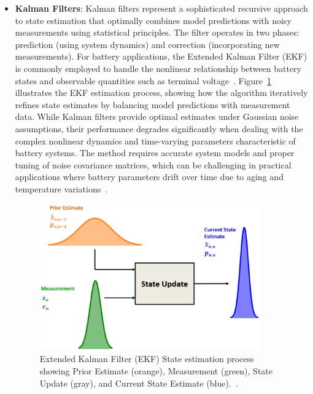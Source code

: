 \begin{itemize}
    \item \textbf{Kalman Filters}: Kalman filters represent a sophisticated recursive approach to state estimation that optimally combines model predictions with noisy measurements using statistical principles. The filter operates in two phases: prediction (using system dynamics) and correction (incorporating new measurements). For battery applications, the Extended Kalman Filter (EKF) is commonly employed to handle the nonlinear relationship between battery states and observable quantities such as terminal voltage~\cite{mastali_battery_2013}. Figure~\ref{fig:ekf_diagram} illustrates the EKF estimation process, showing how the algorithm iteratively refines state estimates by balancing model predictions with measurement data. While Kalman filters provide optimal estimates under Gaussian noise assumptions, their performance degrades significantly when dealing with the complex nonlinear dynamics and time-varying parameters characteristic of battery systems. The method requires accurate system models and proper tuning of noise covariance matrices, which can be challenging in practical applications where battery parameters drift over time due to aging and temperature variations~\cite{becker_wwwkalmanfilternet_online_nodate}.

\begin{figure}[htbp]
\centering
\includegraphics[width=0.9\textwidth]{imgs/ekf.png}
\caption{Extended Kalman Filter (EKF) State estimation process showing Prior Estimate (orange), Measurement (green), State Update (gray), and Current State Estimate (blue).~\cite{becker_wwwkalmanfilternet_online_nodate}.}
\label{fig:ekf_diagram}
\end{figure}
    
\end{itemize}

